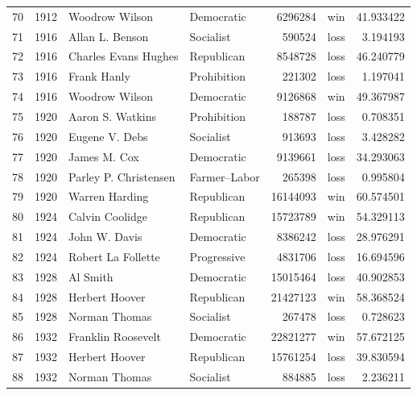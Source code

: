 \documentclass[
  letterpaper,
  DIV=11,
  numbers=noendperiod]{scrreprt}
\begin{document}
\begin{tabular}{lrllrlr}
70  &  1912 &          Woodrow Wilson &             Democratic &       6296284 &    win &  41.933422 \\
71  &  1916 &         Allan L. Benson &              Socialist &        590524 &   loss &   3.194193 \\
72  &  1916 &    Charles Evans Hughes &             Republican &       8548728 &   loss &  46.240779 \\
73  &  1916 &             Frank Hanly &            Prohibition &        221302 &   loss &   1.197041 \\
74  &  1916 &          Woodrow Wilson &             Democratic &       9126868 &    win &  49.367987 \\
75  &  1920 &        Aaron S. Watkins &            Prohibition &        188787 &   loss &   0.708351 \\
76  &  1920 &          Eugene V. Debs &              Socialist &        913693 &   loss &   3.428282 \\
77  &  1920 &            James M. Cox &             Democratic &       9139661 &   loss &  34.293063 \\
78  &  1920 &   Parley P. Christensen &           Farmer–Labor &        265398 &   loss &   0.995804 \\
79  &  1920 &          Warren Harding &             Republican &      16144093 &    win &  60.574501 \\
80  &  1924 &         Calvin Coolidge &             Republican &      15723789 &    win &  54.329113 \\
81  &  1924 &           John W. Davis &             Democratic &       8386242 &   loss &  28.976291 \\
82  &  1924 &      Robert La Follette &            Progressive &       4831706 &   loss &  16.694596 \\
83  &  1928 &                Al Smith &             Democratic &      15015464 &   loss &  40.902853 \\
84  &  1928 &          Herbert Hoover &             Republican &      21427123 &    win &  58.368524 \\
85  &  1928 &           Norman Thomas &              Socialist &        267478 &   loss &   0.728623 \\
86  &  1932 &      Franklin Roosevelt &             Democratic &      22821277 &    win &  57.672125 \\
87  &  1932 &          Herbert Hoover &             Republican &      15761254 &   loss &  39.830594 \\
88  &  1932 &           Norman Thomas &              Socialist &        884885 &   loss &   2.236211 \\

\end{tabular}
\end{document}

